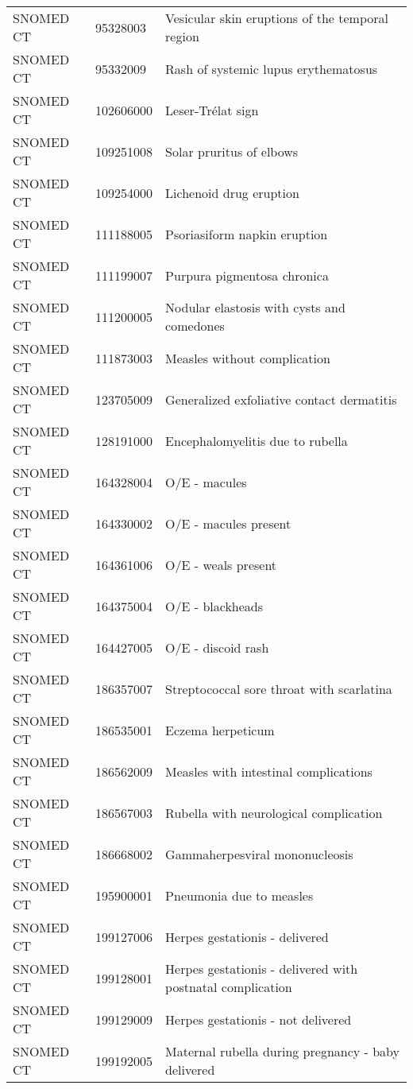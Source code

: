 \begin{longtable}{p{}p{}p{}}
  SNOMED CT & 95328003 & Vesicular skin eruptions of the temporal region \\ 
  SNOMED CT & 95332009 & Rash of systemic lupus erythematosus \\ 
  SNOMED CT & 102606000 & Leser-Trélat sign \\ 
  SNOMED CT & 109251008 & Solar pruritus of elbows \\ 
  SNOMED CT & 109254000 & Lichenoid drug eruption \\ 
  SNOMED CT & 111188005 & Psoriasiform napkin eruption \\ 
  SNOMED CT & 111199007 & Purpura pigmentosa chronica \\ 
  SNOMED CT & 111200005 & Nodular elastosis with cysts and comedones \\ 
  SNOMED CT & 111873003 & Measles without complication \\ 
  SNOMED CT & 123705009 & Generalized exfoliative contact dermatitis \\ 
  SNOMED CT & 128191000 & Encephalomyelitis due to rubella \\ 
  SNOMED CT & 164328004 & O/E - macules \\ 
  SNOMED CT & 164330002 & O/E - macules present \\ 
  SNOMED CT & 164361006 & O/E - weals present \\ 
  SNOMED CT & 164375004 & O/E - blackheads \\ 
  SNOMED CT & 164427005 & O/E - discoid rash \\ 
  SNOMED CT & 186357007 & Streptococcal sore throat with scarlatina \\ 
  SNOMED CT & 186535001 & Eczema herpeticum \\ 
  SNOMED CT & 186562009 & Measles with intestinal complications \\ 
  SNOMED CT & 186567003 & Rubella with neurological complication \\ 
  SNOMED CT & 186668002 & Gammaherpesviral mononucleosis \\ 
  SNOMED CT & 195900001 & Pneumonia due to measles \\ 
  SNOMED CT & 199127006 & Herpes gestationis - delivered \\ 
  SNOMED CT & 199128001 & Herpes gestationis - delivered with postnatal complication \\ 
  SNOMED CT & 199129009 & Herpes gestationis - not delivered \\ 
  SNOMED CT & 199192005 & Maternal rubella during pregnancy - baby delivered \\ 

\end{longtable}

